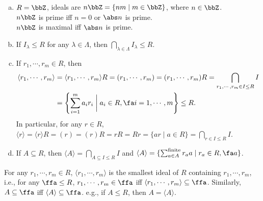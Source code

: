 \begin{example}
    \begin{enumerate}[(a)]
        \item 
            $R = \bbZ$, ideals are $n\bbZ = \{nm \mid m \in \bbZ\}$, where $n \in \bbZ$. \\
            $n\bbZ$ is prime iff $n = 0$ or $\abs n$ is prime. \\
            $n\bbZ$ is maximal iff $\abs n$ is prime.
        \item 
            If $I_\lambda \leq R$ for any $\lambda \in \Lambda$, then $\bigcap_{\lambda \in \Lambda} I_\lambda \leq R$.
        \item 
            If $r_1,\cdots,r_m \in R$, then 
            \begin{align*}
                \langle r_1,\cdots,r_m \rangle &= \langle r_1,\cdots,r_m \rangle R = (r_1,\cdots,r_m) = (r_1,\cdots,r_m)R = \bigcap_{r_1,\cdots,r_m \in I \leq R} I \\
                                               &= \left\{\sum_{i=1}^m a_ir_i \mathrel{\bigg |} a_i \in R,\fa i = 1,\cdots,m\right\} \leq R. 
            \end{align*}
            In particular, for any $r \in R$, $\langle r \rangle = \langle r \rangle R = (r) = (r)R = rR = Rr = \{ar \mid a \in R\} = \bigcap_{r \in I \leq R}I$.
        \item 
            If $A \subseteq R$, then $\langle A \rangle = \bigcap_{A \subseteq I \leq R}I$ and $\langle A \rangle = \{\sum_{a \in A}^{\text{finite}} r_a a \mid r_a \in R,\fa a\}$.
    \end{enumerate}
\end{example}

\begin{fact}
    For any $r_1,\cdots,r_m \in R$, $\langle r_1,\cdots,r_m \rangle$ is the smallest ideal of $R$ containing $r_1,\cdots,r_m$, i.e., for any $\ffa \leq R$, $r_1,\cdots,r_m \in \ffa$ iff $\langle r_1,\cdots,r_m \rangle \subseteq \ffa$. Similarly, $A \subseteq \ffa$ iff $\langle A \rangle \subseteq \ffa$. e.g., if $A \leq R$, then $A = \langle A \rangle$.
\end{fact}

